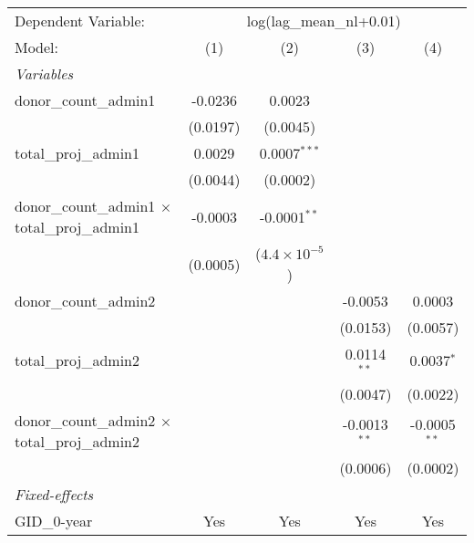 \begingroup
\centering
\begin{tabular}{lcccc}
   \tabularnewline \midrule \midrule
   Dependent Variable: & \multicolumn{4}{c}{log(lag\_mean\_nl+0.01)}\\
   Model:                                                 & (1)      & (2)                    & (3)            & (4)\\  
   \midrule
   \emph{Variables}\\
   donor\_count\_admin1                                   & -0.0236  & 0.0023                 &                &   \\   
                                                          & (0.0197) & (0.0045)               &                &   \\   
   total\_proj\_admin1                                    & 0.0029   & 0.0007$^{***}$         &                &   \\   
                                                          & (0.0044) & (0.0002)               &                &   \\   
   donor\_count\_admin1 $\times$ total\_proj\_admin1      & -0.0003  & -0.0001$^{**}$         &                &   \\   
                                                          & (0.0005) & ($4.4\times 10^{-5}$)  &                &   \\   
   donor\_count\_admin2                                   &          &                        & -0.0053        & 0.0003\\   
                                                          &          &                        & (0.0153)       & (0.0057)\\   
   total\_proj\_admin2                                    &          &                        & 0.0114$^{**}$  & 0.0037$^{*}$\\   
                                                          &          &                        & (0.0047)       & (0.0022)\\   
   donor\_count\_admin2 $\times$ total\_proj\_admin2      &          &                        & -0.0013$^{**}$ & -0.0005$^{**}$\\   
                                                          &          &                        & (0.0006)       & (0.0002)\\   
   \midrule
   \emph{Fixed-effects}\\
   GID\_0-year                                            & Yes      & Yes                    & Yes            & Yes\\  

\end{tabular}
